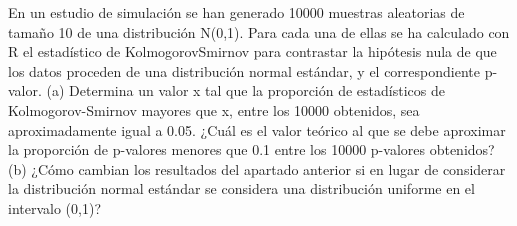 \begin{problem}[12] En un estudio de simulación se han generado 10000 muestras aleatorias de tamaño 10 de una
distribución N(0,1). Para cada una de ellas se ha calculado con R el estadístico de KolmogorovSmirnov
para contrastar la hipótesis nula de que los datos proceden de una distribución normal
estándar, y el correspondiente p-valor.
(a) Determina un valor x tal que la proporción de estadísticos de Kolmogorov-Smirnov mayores
que x, entre los 10000 obtenidos, sea aproximadamente igual a 0.05. ¿Cuál es el valor teórico al que
se debe aproximar la proporción de p-valores menores que 0.1 entre los 10000 p-valores obtenidos?
(b) ¿Cómo cambian los resultados del apartado anterior si en lugar de considerar la distribución
normal estándar se considera una distribución uniforme en el intervalo (0,1)?
\solution

\end{problem}